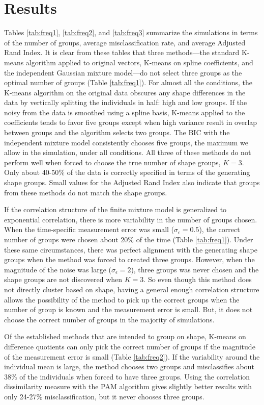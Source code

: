 \section{Results}
Tables \ref{tab:freq1}, \ref{tab:freq2}, and \ref{tab:freq3} summarize the simulations in terms of the number of groups, average misclassification rate, and average Adjusted Rand Index. It is clear from these tables that three methods---the standard K-means algorithm applied to original vectors, K-means on spline coefficients, and the independent Gaussian mixture model---do not select three groups as the optimal number of groups (Table \ref{tab:freq1}). For almost all the conditions, the K-means algorithm on the original data obscures any shape differences in the data by vertically splitting the individuals in half: high and low groups. If the noisy from the data is smoothed using a spline basis, K-means applied to the coefficients tends to favor five groups except when high variance result in overlap between groups and the algorithm selects two groups. The BIC with the independent mixture model consistently chooses five groups, the maximum we allow in the simulation, under all conditions. All three of these methods do not perform well when forced to choose the true number of shape groups, $K=3$. Only about 40-50\% of the data is correctly specified in terms of the generating shape groups. Small values for the Adjusted Rand Index also indicate that groups from these methods do not match the shape groups.

If the correlation structure of the finite mixture model is generalized to exponential correlation, there is more variability in the number of groups chosen. When the time-specific measurement error was small ($\sigma_{\epsilon}=0.5$), the correct number of groups were chosen about 20\% of the time (Table \ref{tab:freq1}). Under these same circumstances, there was perfect alignment with the generating shape groups when the method was forced to created three groups. However, when the magnitude of the noise was large ($\sigma_{\epsilon}=2$), three groups was never chosen and the shape groups are not discovered when $K=3$. So even though this method does not directly cluster based on shape, having a general enough correlation structure allows  the possibility of the method to pick up the correct groups when the number of group is known and the measurement error is small. But, it does not choose the correct number of groups in the majority of simulations. 

Of the established methods that are intended to group on shape, K-means on difference quotients can only pick the correct number of groups if the magnitude of the measurement error is small (Table \ref{tab:freq2}). If the variability around the individual mean is large, the method chooses two groups and misclassifies about 38\% of the individuals when forced to have three groups. Using the correlation dissimilarity measure with the PAM algorithm gives slightly better results with only 24-27\% misclassification, but it never chooses three groups.

